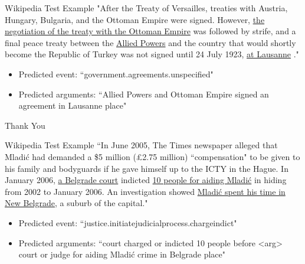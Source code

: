 \documentclass[10pt,aspectratio=1610,professionalfont]{beamer}
\begin{document}
\begin{frame}{Wikipedia Test Example}
    "After the Treaty of Versailles, treaties with Austria, Hungary, Bulgaria, and the Ottoman Empire were signed. However, \underline{the negotiation of the treaty with the Ottoman Empire} was followed by strife, and a final peace treaty between the \underline{Allied Powers} and the country that would shortly become the Republic of Turkey was not signed until 24 July 1923, \underline{at Lausanne} ."
    \begin{itemize}
        \item Predicted event: “government.agreements.unspecified"
        \item Predicted arguments: “Allied Powers and Ottoman Empire signed an agreement in Lausanne place"
    \end{itemize}
\end{frame}


\begin{frame}[standout]
    Thank You
\end{frame}

\begin{frame}[noframenumbering]{Wikipedia Test Example}
    “In June 2005, The Times newspaper alleged that Mladić had demanded a \$5 million (£2.75 million) “compensation" to be given to his family and bodyguards if he gave himself up to the ICTY in the Hague. In January 2006, \underline{a Belgrade court} indicted \underline{10 people for aiding Mladić} in hiding from 2002 to January 2006. An investigation showed \underline{Mladić spent his time in New Belgrade}, a suburb of the capital."

    \begin{itemize}
        \item Predicted event: “justice.initiatejudicialprocess.chargeindict"
        \item Predicted arguments: “court charged or indicted 10 people before  <arg>  court or judge for aiding Mladić crime in Belgrade place"
    \end{itemize}
\end{frame}
\end{document}

